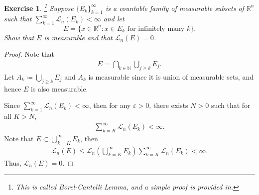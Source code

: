 \documentclass[11pt]{book}
\newtheorem{exercise}{Exercise}[section]
\theoremstyle{definition}
\numberwithin{equation}{chapter}
\begin{document}
\begin{exercise}\footnote{This is called Borel-Cantelli Lemma, and a simple proof is provided in\cite{22}.}
Suppose $\{E_k\}^\infty_{k=1}$ is a countable family of measurable subsets of $\mathbb{R}^n$ such that
$\sum^\infty_{k=1} \mathcal{L}_n(E_k)<\infty$ and let
$$
E=\{ x\in\mathbb{R}^n:x\in E_k\text{ for infinitely many }k\}.
$$
Show that $E$ is measurable and that $\mathcal{L}_n(E)=0$.
\end{exercise}
\begin{proof}
Note that 
\begin{align*}
    E = \bigcap_{k\in \mathbb{N}} \bigcup_{j\geq k} E_j.
\end{align*}
Let $A_k \coloneqq \bigcup_{j\geq k} E_j$ and $A_k$ is measurable since it is union of measurable sets, and hence $E$ is also measurable.

Since $\sum^\infty_{k=1} \mathcal{L}_n(E_k) < \infty$, then for any $\varepsilon > 0$, there exists $N > 0$ such that for all $K > N$,
\begin{align*}
    \sum^\infty_{k=K} \mathcal{L}_n(E_k) < \infty.
\end{align*}
Note that $E \subset \bigcup^\infty_{k=K} E_k$, then
\begin{align*}
    \mathcal{L}_n(E) \leq \mathcal{L}_n\left(\bigcup^\infty_{k=K} E_k\right) \sum^\infty_{k=K} \mathcal{L}_n(E_k) < \infty.
\end{align*}
Thus, $\mathcal{L}_n(E)=0$.
\end{proof}

\medskip
\end{document}

